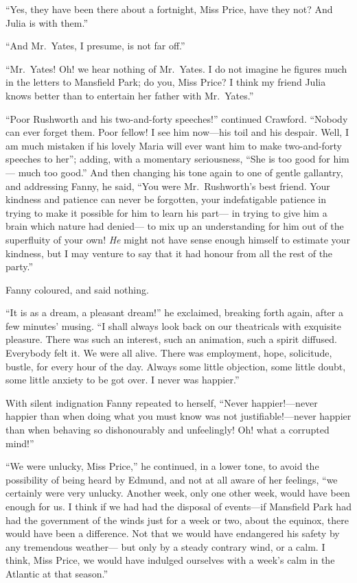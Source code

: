 \documentclass{article}
\begin{document}
``Yes, they have been there about a fortnight, Miss Price,
have they not?  And Julia is with them.''

``And Mr.\ Yates, I presume, is not far off.''

``Mr.\ Yates!  Oh! we hear nothing of Mr.\ Yates.  I do not
imagine he figures much in the letters to Mansfield Park;
do you, Miss Price?  I think my friend Julia knows better
than to entertain her father with Mr.\ Yates.''

``Poor Rushworth and his two-and-forty speeches!''
continued Crawford.  ``Nobody can ever forget them.
Poor fellow!  I see him now---his toil and his despair.
Well, I am much mistaken if his lovely Maria will ever
want him to make two-and-forty speeches to her''; adding,
with a momentary seriousness, ``She is too good for him---%
much too good.''  And then changing his tone again to one
of gentle gallantry, and addressing Fanny, he said,
``You were Mr.\ Rushworth's best friend.  Your kindness and
patience can never be forgotten, your indefatigable patience
in trying to make it possible for him to learn his part---%
in trying to give him a brain which nature had denied---%
to mix up an understanding for him out of the superfluity
of your own!  \emph{He} might not have sense enough himself
to estimate your kindness, but I may venture to say that it
had honour from all the rest of the party.''

Fanny coloured, and said nothing.

``It is as a dream, a pleasant dream!'' he exclaimed,
breaking forth again, after a few minutes' musing.  ``I shall
always look back on our theatricals with exquisite pleasure.
There was such an interest, such an animation, such a
spirit diffused.  Everybody felt it.  We were all alive.
There was employment, hope, solicitude, bustle, for every
hour of the day.  Always some little objection,
some little doubt, some little anxiety to be got over.
I never was happier.''

With silent indignation Fanny repeated to herself,
``Never happier!---never happier than when doing what
you must know was not justifiable!---never happier
than when behaving so dishonourably and unfeelingly!
Oh! what a corrupted mind!''

``We were unlucky, Miss Price,'' he continued, in a lower tone,
to avoid the possibility of being heard by Edmund,
and not at all aware of her feelings, ``we certainly
were very unlucky.  Another week, only one other week,
would have been enough for us.  I think if we had had the
disposal of events---if Mansfield Park had had the government
of the winds just for a week or two, about the equinox,
there would have been a difference.  Not that we would
have endangered his safety by any tremendous weather---%
but only by a steady contrary wind, or a calm.  I think,
Miss Price, we would have indulged ourselves with a week's
calm in the Atlantic at that season.''
\end{document}
